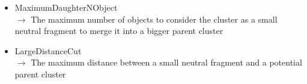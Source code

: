 \documentclass[12pt]{article}
\begin{document}
\begin{itemize}
  \item MaximumDaughterNObject \\
  $\rightarrow$ The maximum number of objects to consider the cluster as a small neutral fragment to merge it into a bigger parent cluster
  \item LargeDistanceCut \\
  $\rightarrow$ The maximum distance between a small neutral fragment and a potential parent cluster
\end{itemize}
\end{document}
